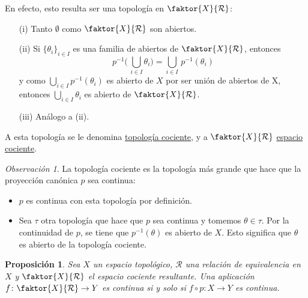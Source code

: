 \documentclass[12pt]{report}
\newtheorem{proposition}{Proposición}[chapter]
\theoremstyle{definition}
\theoremstyle{definition}
\theoremstyle{remark}
\newtheorem*{obs}{Observación} %
\begin{document}
\vspace{2mm}
En efecto, esto resulta ser una topología en $\faktor{X}{\mathcal{R}}$:
\begin{itemize}
    \item[(i)] Tanto $\emptyset$ como $\faktor{X}{\mathcal{R}}$ son abiertos.
    \item[(ii)] Si $\{\theta_i\}_{i \in I}$ es una familia de abiertos de $\faktor{X}{\mathcal{R}}$, entonces \[p^{-1}\biggl( \, \bigcup_{i \in I}\theta_i \biggr ) = \bigcup_{i \in I} \, p^{-1}(\theta_i)\]
    y como $\bigcup_{i \in I}p^{-1}(\theta_i)$ es abierto de $X$ por ser unión de abiertos de X, entonces $\bigcup_{i \in I}\theta_i$ es abierto de $\faktor{X}{\mathcal{R}}$.
    \item[(iii)] Análogo a (ii).
\end{itemize}

A esta topología se le denomina \underline{topología cociente}, y a $\faktor{X}{\mathcal{R}}$ \underline{espacio cociente}.

\vspace{2mm}
\begin{obs}
La topología cociente es la topología más grande que hace que la proyección canónica $p$ sea continua:
\begin{itemize}
    \item $p$ es continua con esta topología por definición.
    \item Sea $\tau$ otra topología que hace que $p$ sea continua y tomemos $\theta \in \tau$. Por la continuidad de $p$, se tiene que $p^{-1}(\theta)$ es abierto de $X$. Esto significa que $\theta$ es abierto de la topología cociente.
\end{itemize}
\end{obs}

\begin{proposition}
Sea $X$ un espacio topológico, $\mathcal{R}$ una relación de equivalencia en $X$ y $\faktor{X}{\mathcal{R}}$ el espacio cociente resultante. Una aplicación $f \colon \faktor{X}{\mathcal{R}} \to Y$ es continua si y solo si $f \circ p \colon X \to Y$ es continua.
\end{proposition}
\end{document}
